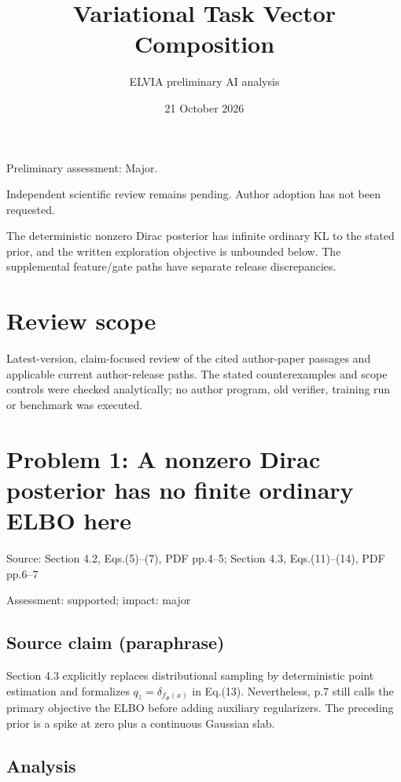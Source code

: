 \documentclass[11pt]{article}
\begin{document}
\title{Variational Task Vector Composition}

\author{ELVIA preliminary AI analysis}\date{21 October 2026}\maketitle

Preliminary assessment: Major.\par

Independent scientific review remains pending. Author adoption has not been requested.

The deterministic nonzero Dirac posterior has infinite ordinary KL to the stated prior, and the written exploration objective is unbounded below. The supplemental feature/gate paths have separate release discrepancies.

\section*{Review scope}

Latest-version, claim-focused review of the cited author-paper passages and applicable current author-release paths. The stated counterexamples and scope controls were checked analytically; no author program, old verifier, training run or benchmark was executed.

\section*{Problem 1: A nonzero Dirac posterior has no finite ordinary ELBO here}

Source: Section 4.2, Eqs.(5)–(7), PDF pp.4–5; Section 4.3, Eqs.(11)–(14), PDF pp.6–7

Assessment: supported; impact: major

\subsection*{Source claim (paraphrase)}

Section 4.3 explicitly replaces distributional sampling by deterministic point estimation and formalizes \(q_z=\delta_{f_\Phi(x)}\) in Eq.(13). Nevertheless, p.7 still calls the primary objective the ELBO before adding auxiliary regularizers. The preceding prior is a spike at zero plus a continuous Gaussian slab.

\subsection*{Analysis}
\end{document}
